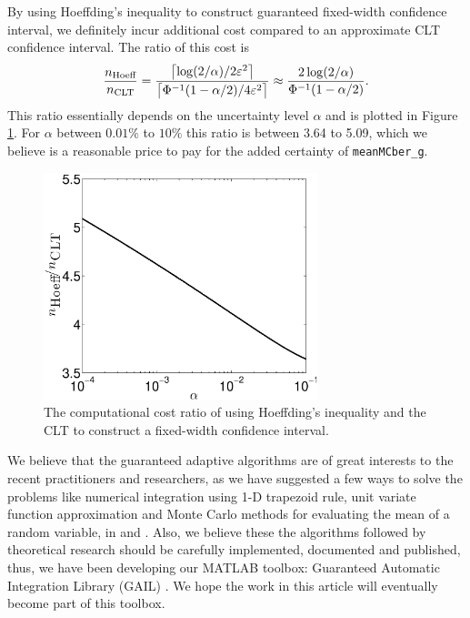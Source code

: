 \documentclass{iitthesis}
\begin{document}
By using Hoeffding's inequality to construct guaranteed fixed-width confidence interval, we definitely incur additional cost compared to an approximate CLT confidence interval.  The ratio of this cost is 
\begin{equation}
\frac{n_{\text{Hoeff}}}{n_{\text{CLT}}} = \frac{\left \lceil \log(2/\alpha)/{2\varepsilon^2} \right \rceil}{\left \lceil{ \Phi^{-1}(1-\alpha/2)}/{4 \varepsilon^2}\right\rceil} \approx  \frac{2\log(2/\alpha)}{\Phi^{-1}(1-\alpha/2)}.
\end{equation}
This ratio essentially depends on the uncertainty level $\alpha$ and is plotted in Figure \ref{fig:ratiovsalpha}. For $\alpha$ between $0.01\%$ to $10\%$ this ratio is between 3.64 to 5.09, which we believe is a reasonable price to pay for the added certainty of {\tt meanMCber\_g}.

  \begin{figure}[htbp]
    \centering
    \includegraphics[width=8cm]{plotHoeffCLTr.eps} %
    \caption{The computational cost ratio of using Hoeffding's inequality and the CLT to construct a fixed-width confidence interval.}
    \label{fig:ratiovsalpha}
 \end{figure}
 

\label{chapter:comclusion}
\label{chapter: future work}
We believe that the guaranteed adaptive algorithms are of great interests to the recent practitioners and researchers, as we have suggested a few ways to solve the problems like numerical integration using 1-D trapezoid rule, unit variate function approximation and Monte Carlo methods for evaluating the mean of a random variable,  in \cite{CDHHZ13} and \cite{HJLO12}. Also, we believe these the algorithms followed by theoretical research should be carefully implemented, documented and published, thus, we have been developing our MATLAB toolbox: Guaranteed Automatic Integration Library (GAIL) \cite{GAIL_1_3}. We hope the work in this article will eventually become part of this toolbox.
\end{document}
